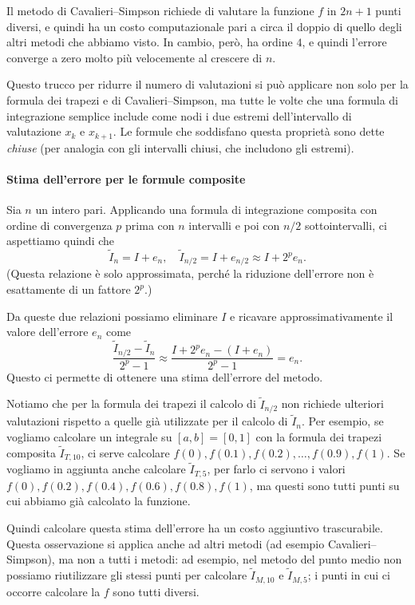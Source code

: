 \documentclass[a4paper]{report}
\theoremstyle{definition}
\theoremstyle{remark}
\newcommand{\checkkey}[1]{%
        \ifstrequal{#1}{inf}{\setbool{showcontent}{true}}{}%
    }
\newenvironment{conditional}[1][]{%
        \setbool{showcontent}{false}%
        \forcsvlist\checkkey{#1}%
        \ifbool{showcontent}{\begingroup}{\expandafter\comment}%
    }{%
        \ifbool{showcontent}{\endgroup}{\expandafter\endcomment}%
    }
\newcommand{\checkkey}[1]{%
        \ifstrequal{#1}{ich}{\setbool{showcontent}{true}}{}%
    }
\newenvironment{conditional}[1][]{%
        \setbool{showcontent}{false}%
        \forcsvlist\checkkey{#1}%
        \ifbool{showcontent}{\begingroup}{\expandafter\comment}%
    }{%
        \ifbool{showcontent}{\endgroup}{\expandafter\endcomment}%
    }
\begin{document}
\begin{conditional}[ich]
Il metodo di Cavalieri--Simpson richiede di valutare la funzione $f$ in $2n+1$ punti diversi, e quindi ha un costo computazionale pari a circa il doppio di quello degli altri metodi che abbiamo visto. In cambio, però, ha ordine $4$, e quindi l'errore converge a zero molto più velocemente al crescere di $n$.

Questo trucco per ridurre il numero di valutazioni si può applicare non solo per la formula dei trapezi e di Cavalieri--Simpson, ma tutte le volte che una formula di integrazione semplice include come nodi i due estremi dell'intervallo di valutazione $x_k$ e $x_{k+1}$. Le formule che soddisfano questa proprietà sono dette \emph{chiuse} (per analogia con gli intervalli chiusi, che includono gli estremi).

\paragraph{Stima dell'errore per le formule composite} Sia $n$ un intero pari. Applicando una formula di integrazione composita con ordine di convergenza $p$ prima con $n$ intervalli e poi con $n/2$ sottointervalli, ci aspettiamo quindi che
\[
    \tilde{I}_n = I + e_n, \quad \tilde{I}_{n/2} = I + e_{n/2} \approx I + 2^{p}e_n.
\]
(Questa relazione è solo approssimata, perché la riduzione dell'errore non è esattamente di un fattore $2^p$.)

Da queste due relazioni possiamo eliminare $I$ e ricavare approssimativamente il valore dell'errore $e_n$ come
\[
\frac{\tilde{I}_{n/2} - \tilde{I}_{n}}{2^p -1} \approx \frac{I + 2^p e_n -(I+e_n)}{2^p-1} = e_n.
\]
Questo ci permette di ottenere una stima dell'errore del metodo.

Notiamo che per la formula dei trapezi il calcolo di $\tilde{I}_{n/2}$ non richiede ulteriori valutazioni rispetto a quelle già utilizzate per il calcolo di $\tilde{I}_n$. Per esempio, se vogliamo calcolare un integrale su $[a,b]=[0,1]$ con la formula dei trapezi composita $\tilde{I}_{T,10}$, ci serve calcolare $f(0),f(0.1),f(0.2),\dots,f(0.9),f(1)$. Se vogliamo in aggiunta anche calcolare $\tilde{I}_{T,5}$, per farlo ci servono i valori $f(0),f(0.2),f(0.4),f(0.6),f(0.8),f(1)$, ma questi sono tutti punti su cui abbiamo già calcolato la funzione.

Quindi calcolare questa stima dell'errore ha un costo aggiuntivo trascurabile. Questa osservazione si applica anche ad altri metodi (ad esempio Cavalieri--Simpson), ma non a tutti i metodi: ad esempio, nel metodo del punto medio non possiamo riutilizzare gli stessi punti per calcolare $\tilde{I}_{M,10}$ e $\tilde{I}_{M,5}$; i punti in cui ci occorre calcolare la $f$ sono tutti diversi.


\end{conditional}
\end{document}

